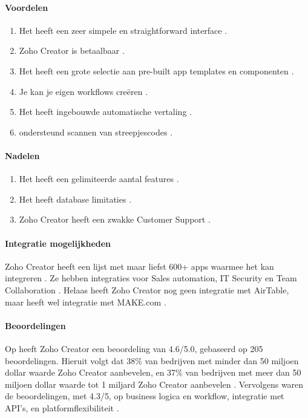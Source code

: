 \paragraph*{Voordelen}
\begin{enumerate}
    \item Het heeft een zeer simpele en straightforward interface \autocite{Marvin2017Zoho}.
    \item Zoho Creator is betaalbaar  \autocite{Marvin2017Zoho}.
    \item Het heeft een grote selectie aan pre-built app templates en componenten \autocite{Marvin2017Zoho}.
    \item Je kan je eigen workflows creëren \autocite{Marvin2017Zoho}.
    \item Het heeft ingebouwde automatische vertaling \autocite{Marvin2017Zoho}.
    \item ondersteund scannen van streepjescodes \autocite{Marvin2017Zoho}.
\end{enumerate}


\paragraph*{Nadelen}
\begin{enumerate}
    \item Het heeft een gelimiteerde aantal features \autocite{G22024}.
    \item Het heeft database limitaties \autocite{G22024}.
    \item Zoho Creator heeft een zwakke Customer Support \autocite{G22024}.
\end{enumerate}

\paragraph{Integratie mogelijkheden}
Zoho Creator heeft een lijst met maar liefst 600+ apps waarmee het kan integreren \autocite{ZohoCorporation2024b}. Ze hebben integraties voor Sales automation, IT Security en Team Collaboration \autocite{ZohoCorporation2024b}.
Helaas heeft Zoho Creator nog geen integratie met AirTable, maar heeft wel integratie met MAKE.com \autocite{MAKE.com2024}.

\paragraph{Beoordelingen}
Op \textcite{Gartner2024} heeft Zoho Creator een beoordeling van 4.6/5.0, gebaseerd op 205 beoordelingen. Hieruit volgt dat 38\% van bedrijven met minder dan 50 miljoen dollar waarde Zoho Creator aanbevelen, 
en 37\% van bedrijven met meer dan 50 miljoen dollar waarde tot 1 miljard Zoho Creator aanbevelen \autocite{Gartner2024}. Vervolgens waren de beoordelingen, met 4.3/5, op business logica en workflow, integratie met API's, en platformflexibiliteit \autocite{Gartner2024}.
